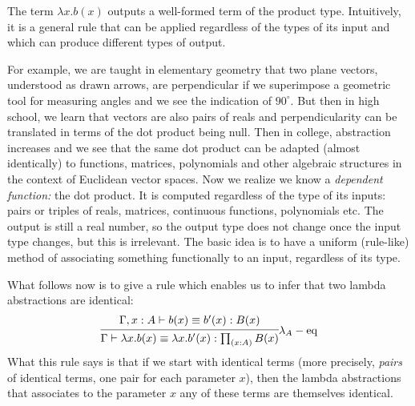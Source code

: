 The term $ \lambda x . b(x) $ outputs a well-formed term of the
product type. Intuitively, it is a general rule that can be applied
 regardless of the types of its input and which
can produce different types of output.

For example, we are taught in elementary geometry that two plane vectors,
understood as drawn arrows, are perpendicular if we superimpose a geometric
tool for measuring angles and we see the indication of $ 90^\circ $.
But then in high school, we learn that vectors are also pairs of reals
and perpendicularity can be translated in terms of the dot product
being null. Then in college, abstraction increases and we see that the
same dot product can be adapted (almost identically) to functions, matrices,
polynomials and other algebraic structures in the context of Euclidean
vector spaces. Now we realize we know a \emph{dependent function:} the
dot product. It is computed  regardless of the
type of its inputs: pairs or triples of reals, matrices, continuous
functions, polynomials etc. The output is still a real number, so the
output type does not change once the input type changes, but this is
irrelevant. The basic idea is to have a uniform (rule-like) method of
associating something functionally to an input, regardless of its type.

What follows now is to give a rule which enables us to infer that two
lambda abstractions are identical:
\[
  \begin{prooftree}
    \hypo{\Gamma, x : A \vdash b(x) \equiv b'(x) : B(x)}
    \infer1{\Gamma \vdash \lambda x . b(x) \equiv %
      \lambda x . b'(x) : \prod_{(x : A)} B(x)}
  \end{prooftree}\lambda_A-\text{eq}
\]
What this rule says is that if we start with identical terms (more
precisely, \emph{pairs} of identical terms, one pair for each
parameter $ x $), then the lambda abstractions that associates to
the parameter $ x $ any of these terms are themselves identical.

